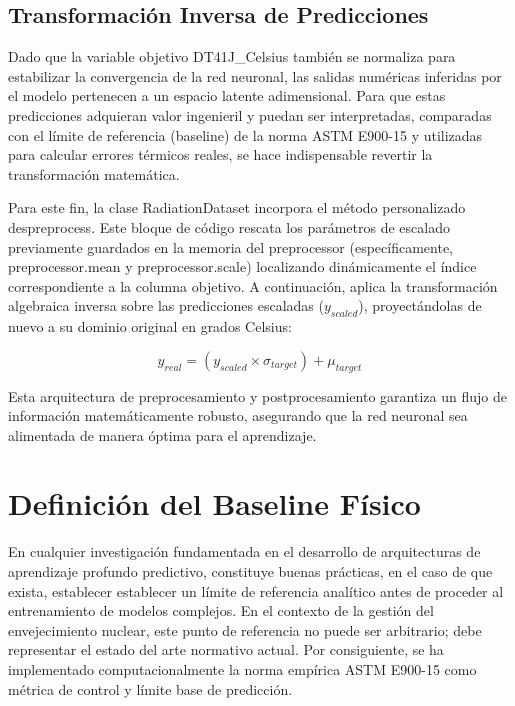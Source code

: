 \documentclass[a4paper, 12pt, twocolumn]{book}
\begin{document}
\subsection{Transformación Inversa de Predicciones}

Dado que la variable objetivo DT41J\_Celsius también se normaliza para estabilizar la convergencia de la red neuronal, las salidas numéricas inferidas por el modelo pertenecen a un espacio latente adimensional. Para que estas predicciones adquieran valor ingenieril y puedan ser interpretadas, comparadas con el límite de referencia (baseline) de la norma ASTM E900-15 y utilizadas para calcular errores térmicos reales, se hace indispensable revertir la transformación matemática.

Para este fin, la clase RadiationDataset incorpora el método personalizado despreprocess. Este bloque de código rescata los parámetros de escalado previamente guardados en la memoria del preprocessor (específicamente, preprocessor.mean y preprocessor.scale) localizando dinámicamente el índice correspondiente a la columna objetivo. A continuación, aplica la transformación algebraica inversa sobre las predicciones escaladas ($y_{scaled}$), proyectándolas de nuevo a su dominio original en grados Celsius:

\begin{equation}
    y_{real} = (y_{scaled} \times \sigma_{target}) + \mu_{target}
\end{equation}

Esta arquitectura de preprocesamiento y postprocesamiento garantiza un flujo de información matemáticamente robusto, asegurando que la red neuronal sea alimentada de manera óptima para el aprendizaje.

\section{Definición del Baseline Físico}

En cualquier investigación fundamentada en el desarrollo de arquitecturas de aprendizaje profundo predictivo, constituye buenas prácticas, en el caso de que exista, establecer establecer un límite de referencia analítico antes de proceder al entrenamiento de modelos complejos. En el contexto de la gestión del envejecimiento nuclear, este punto de referencia no puede ser arbitrario; debe representar el estado del arte normativo actual. Por consiguiente, se ha implementado computacionalmente la norma empírica ASTM E900-15 como métrica de control y límite base de predicción.
\end{document}
